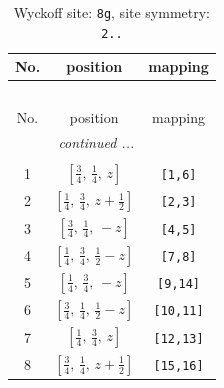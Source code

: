 \documentclass[fleqn,8pt]{jsarticle}
\begin{document}
\begin{longtable}{ccc}
\caption{Wyckoff site: {\tt 8g}, site symmetry: {\tt 2..}}
 \\
 \hline \hline
No. & position & mapping \\ \hline \endfirsthead

\multicolumn{2}{l}{\tablename\ \thetable{}} \\
 \hline \hline
No. & position & mapping \\ \hline \endhead

 \hline \hline
\multicolumn{2}{r}{\footnotesize\it continued ...} \\ \endfoot

 \hline \hline
\multicolumn{2}{r}{} \\ \endlastfoot

1 & $\left[ \frac{3}{4},\, \frac{1}{4},\, z \right]$ & {\tt [1,6]} \\ \hline
2 & $\left[ \frac{1}{4},\, \frac{3}{4},\, z + \frac{1}{2} \right]$ & {\tt [2,3]} \\ \hline
3 & $\left[ \frac{3}{4},\, \frac{1}{4},\, - z \right]$ & {\tt [4,5]} \\ \hline
4 & $\left[ \frac{1}{4},\, \frac{3}{4},\, \frac{1}{2} - z \right]$ & {\tt [7,8]} \\ \hline
5 & $\left[ \frac{1}{4},\, \frac{3}{4},\, - z \right]$ & {\tt [9,14]} \\ \hline
6 & $\left[ \frac{3}{4},\, \frac{1}{4},\, \frac{1}{2} - z \right]$ & {\tt [10,11]} \\ \hline
7 & $\left[ \frac{1}{4},\, \frac{3}{4},\, z \right]$ & {\tt [12,13]} \\ \hline
8 & $\left[ \frac{3}{4},\, \frac{1}{4},\, z + \frac{1}{2} \right]$ & {\tt [15,16]} \\
\end{longtable}
\renewcommand{\arraystretch}{1.2}
\end{document}

